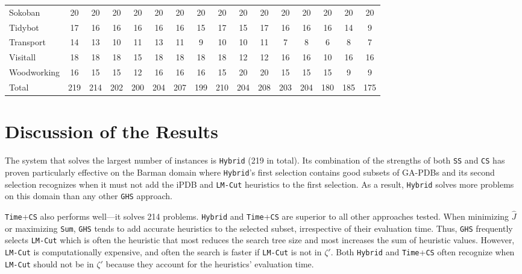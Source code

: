 \begin{table}[htb]
\begin{tabular}{lccccccccccccccc}
Sokoban&       20&     20&    20&   20&   20&   20&  20&   20&    20&  20&   20&   20&   20&    20&  20\\
Tidybot&       17&     16&    16&   16&   16&   16&  15&   17&    15&  17&   16&   16&   16&    14&   9\\
Transport&     14&     13&    10&   11&   13&   11&   9&   10&    10&  11&    7&    8&    6&     8&   7\\
Visitall&      18&     18&    18&   15&   18&   18&  18&   18&    12&  12&   16&   16&   10&    16&  16\\
Woodworking&   16&     15&    15&   12&   16&   16&  16&   15&    20&  20&   15&   15&   15&     9&   9\\ \hline
Total&        219&    214&   202&  200&  204&  207& 199&  210&   204& 208&  203&  204&  180&   185& 175\\ \hline
\end{tabular}
\label{tb_two}
\end{table}

\section{Discussion of the Results}
\noindent
The system that solves the largest number of instances is \texttt{Hybrid} (219 in total). Its combination of the strengths of both \texttt{SS} and \texttt{CS} has proven particularly effective on the Barman domain where \texttt{Hybrid}'s first selection contains good subsets of GA-PDBs and its second selection recognizes when it must not add the iPDB and \texttt{LM-Cut} heuristics to the first selection. As a result, \texttt{Hybrid} solves more problems on this domain than any other \texttt{GHS} approach. 

\texttt{Time}+\texttt{CS} also performs well---it solves 214 problems.  \texttt{Hybrid} and \texttt{Time}+\texttt{CS} are superior to all other approaches tested. %
When minimizing $\hat{J}$ or maximizing \texttt{Sum}, \texttt{GHS} tends to add accurate heuristics to the selected subset, irrespective of their evaluation time. Thus, \texttt{GHS} frequently selects \texttt{LM-Cut} which is often the heuristic that most reduces the search tree size and most increases the sum of heuristic values. However, \texttt{LM-Cut} is computationally expensive, and often  the search is faster if \texttt{LM-Cut} is not in $\zeta'$. Both \texttt{Hybrid} and \texttt{Time}+\texttt{CS} often recognize when \texttt{LM-Cut} should not be in $\zeta'$ because they account for the heuristics' evaluation time.


